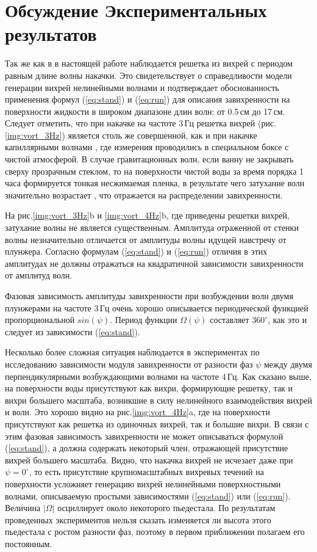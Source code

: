 \section{Обсуждение Экспериментальных результатов} \label{sect4_4}
Так же как в \cite{parf, fil} в настоящей работе наблюдается решетка из вихрей с периодом равным длине волны накачки. Это свидетельствует о справедливости модели генерации вихрей нелинейными волнами и подтверждает обоснованность применения формул (\ref{eq:stand}) и (\ref{eq:run}) для описания завихренности на поверхности жидкости в широком диапазоне длин волн: от 0.5\,см до 17\,см. Следует отметить, что при накачке на частоте 3\,Гц решетка вихрей (рис.\ref{img:vort_3Hz}) является столь же совершенной, как и при накачке капиллярными волнами \cite{parf}, где измерения проводились в специальном боксе с чистой атмосферой. В случае гравитационных волн, если ванну не закрывать сверху прозрачным стеклом, то на поверхности чистой воды за время порядка 1 часа формируется тонкая несжимаемая пленка, в результате чего затухание волн значительно возрастает \cite{land}, что отражается на распределении завихренности.

На рис.\ref{img:vort_3Hz}b и \ref{img:vort_4Hz}b, где приведены решетки вихрей, затухание волны не является существенным. Амплитуда отраженной от стенки волны незначительно отличается от амплитуды волны идущей навстречу от плунжера. Согласно формулам (\ref{eq:stand}) и (\ref{eq:run}) отличия в этих амплитудах не должны отражаться на квадратичной зависимости завихренности от амплитуд волн. 

Фазовая зависимость амплитуды завихренности при возбуждении волн двумя плунжерами на частоте 3\,Гц очень хорошо описывается периодической функцией пропорциональной $sin(\psi)$. Период функции $\Omega (\psi)$ составляет $360^\circ$, как это и следует из зависимости (\ref{eq:stand}). 

Несколько более сложная ситуация наблюдается в экспериментах по исследованию зависимости модуля завихренности от разности фаз $\psi$ между двумя перпендикулярными возбуждающими волнами на частоте 4\,Гц. Как сказано выше, на поверхности воды присутствуют как вихри, формирующие решетку, так и вихри большего масштаба, возникшие в силу нелинейного взаимодействия вихрей и волн. Это хорошо видно на рис.\ref{img:vort_4Hz}a, где на поверхности присутствуют как решетка из одиночных вихрей, так и большие вихри. В связи с этим фазовая зависимость завихренности не может описываться формулой (\ref{eq:stand}), а должна содержать некоторый член, отражающей присутствие вихрей большего масштаба. Видно, что накачка вихрей не исчезает даже при $\psi=0^\circ$, то есть присутствие крупномасштабных вихревых течений на поверхности усложняет генерацию вихрей нелинейными поверхностными волнами, описываемую простыми зависимостями (\ref{eq:stand}) или (\ref{eq:run}). Величина $|\Omega|$ осциллирует около некоторого пьедестала. По результатам проведенных экспериментов нельзя сказать изменяется ли высота этого пьедестала с ростом разности фаз, поэтому в первом приближении полагаем его постоянным. 

